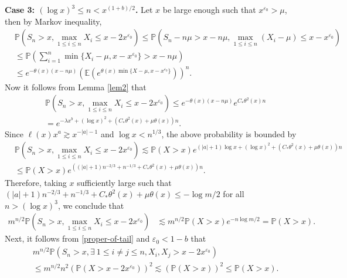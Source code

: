 \documentclass[11pt]{article}
\numberwithin{equation}{section}
\begin{document}
\noindent
{\bf Case 3: $(\log x)^3\leq n <x^{(1+b)/2}$.}
Let $x$ be large enough such that $x^{\varepsilon_0}>\mu$,  then by Markov inequality, 
\begin{align}\label{e33-2}
	&\mathbb{P}\left(S_n >x, \max_{1\leq i\leq n} X_i \leq x-2x^{\varepsilon_0} \right)  \leq \mathbb{P}\left(S_n-n\mu >x-n\mu, \max_{1\leq i\leq n} (X_i-\mu) \leq x-x^{\varepsilon_0} \right) \nonumber\\
	& \leq  \mathbb{P}\left(\sum_{i=1}^n \min\{ X_i-\mu, x-x^{\varepsilon_0}\}>x-n\mu \right)\nonumber\\
	& \leq e^{-\theta(x)(x-n\mu)}\left(\mathbb{E}\left( e^{\theta(x) \min\{ X-\mu, x-x^{\varepsilon_0}\} } \right)\right)^n.
\end{align}
Now it follows from Lemma \ref{lem2} that 
\begin{align}\label{e8-1}
	& \mathbb{P}\left(S_n >x, \max_{1\leq i\leq n} X_i \leq x-2x^{\varepsilon_0} \right) \leq e^{-\theta(x)(x-n\mu)} e^{C_*\theta^2(x)n}\nonumber\\
	&=  e^{-\lambda x^{b} +(\log x)^2+\left(C_*\theta^2(x)+ \mu \theta(x) \right)n}.
\end{align}
Since $\ell(x)x^a \gtrsim x^{-|a|-1}$ and  $\log x<n^{1/3}$, the above probability is bounded by
\begin{align}
	& \mathbb{P}\left(S_n >x, \max_{1\leq i\leq n} X_i \leq x-2x^{\varepsilon_0} \right)  \lesssim \mathbb{P}(X>x) e^{ (|a|+1)\log x +(\log x)^2+\left(C_*\theta^2(x)+ \mu \theta(x) \right)n}\nonumber\\
	& \leq \mathbb{P}(X>x) e^{ \left((|a|+1)n^{-2/3} +n^{-1/3}+C_*\theta^2(x)+ \mu \theta(x) \right)n}. 
\end{align}
Therefore, taking $x$ sufficiently large such that 
$(|a|+1)n^{-2/3} +n^{-1/3}+C_*\theta^2(x) + \mu \theta(x) \leq -\log m/2$ for all $n> (\log x)^3$, we conclude that 
\begin{align}\label{e9-1}
		m^{n/2}\mathbb{P}\left(S_n >x, \max_{1\leq i\leq n} X_i \leq x-2x^{\varepsilon_0} \right)&  \lesssim m^{n/2} \mathbb{P}(X>x) e^{-n\log m/2} =  \mathbb{P}(X>x) .
\end{align}
Next, it follows from \eqref{proper-of-tail} and  $\varepsilon_0<1-b$ that
\begin{align}\label{e9-2}
	& m^{n/2} \mathbb{P}\left(S_n >x,  \exists\  1\leq  i\neq j\leq n, X_i, X_j > x-2x^{\varepsilon_0} \right) \nonumber\\
	& \leq m^{n/2} n^2 \left(\mathbb{P}(X> x-2x^{\varepsilon_0})\right)^2 \lesssim   \left(\mathbb{P}(X> x)\right)^2 \leq  \mathbb{P}(X> x).
\end{align}
\end{document}
